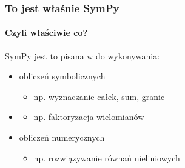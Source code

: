\documentclass{beamer}
\begin{document}
\begin{frame}
    \frametitle{To jest właśnie SymPy}
    \framesubtitle{Czyli właściwie co?}

    SymPy jest to  pisana w  do wykonywania:
    \begin{itemize}
        \pause
        \item obliczeń symbolicznych
            \begin{itemize}
                \item np. wyznaczanie całek, sum, granic
            \end{itemize}
        \pause
        \item {}
            \begin{itemize}
                \item np. faktoryzacja wielomianów
            \end{itemize}
        \pause
        \item obliczeń numerycznych
            \begin{itemize}
                \item np. rozwiązywanie równań nieliniowych
            \end{itemize}
    \end{itemize}
\end{frame}
\end{document}
